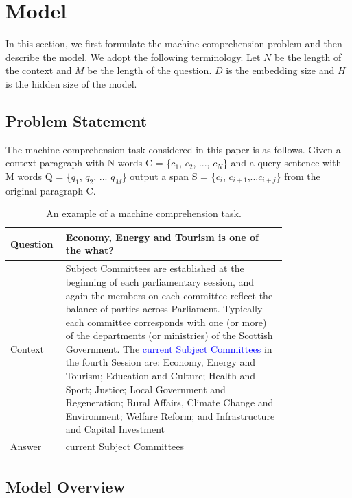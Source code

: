 \section{Model}
\label{sec:model}

In this section, we first formulate the machine comprehension problem and then describe the model. We adopt the following terminology. Let $N$ be the length of the context and $M$ be the length of the question. $D$ is the embedding size and $H$ is the hidden size of the model.


\subsection{Problem Statement}
\label{subsec:problemstatement}

The machine comprehension task considered in this paper is as follows. Given a context paragraph with N words C = \{$c_1$, $c_2$, ..., $c_N$\} and a query sentence with M words Q = \{$q_1$, $q_2$, ... $q_M$\} output a span S = \{$c_i$, $c_{i+1}$,...${c_{i+j}}$\} from the original paragraph C. 

\begin{table}[htbp]
    \caption{An example of a machine comprehension task.}
    \label{table:economicSchools} 
    \centering
    \begin{tabular}{|l|p{0.8\linewidth}|}
    \hline
    Question   &  Economy, Energy and Tourism is one of the what? \tabularnewline \hline
    Context  & Subject Committees are established at the beginning of each parliamentary session, and again the members on each committee reflect the balance of parties across Parliament. Typically each committee corresponds with one (or more) of the departments (or ministries) of the Scottish Government. The \textcolor{blue}{current Subject Committees} in the fourth Session are: Economy, Energy and Tourism; Education and Culture; Health and Sport; Justice; Local Government and Regeneration; Rural Affairs, Climate Change and Environment; Welfare Reform; and Infrastructure and Capital Investment \tabularnewline \hline
    Answer   & current Subject Committees \tabularnewline \hline
    \end{tabular}
 
\end{table}

\subsection{Model Overview}
\label{subsec:models}

